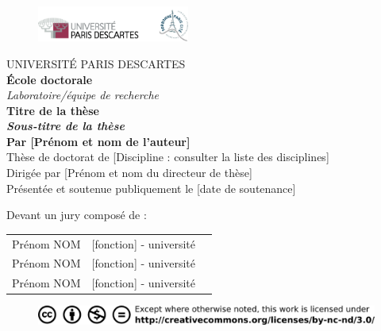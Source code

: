 \begin{titlepage}
\frontmatter
\begin{figure}[t]
\includegraphics[width=5cm]{figures-ext/LogoParisDescartes}
\end{figure}

\begin{center}
UNIVERSITÉ PARIS DESCARTES \\
\vspace*{1cm}
\textbf{École doctorale}\\
\vspace*{0,5cm}
\textit{Laboratoire/équipe de recherche}\\
\vspace*{1cm}
\LARGE{\textbf{Titre de la thèse}}\\
\vspace*{0,5cm}
\large{\textit{\textbf{Sous-titre de la thèse}}}\\
\vspace*{2cm}
\large{\textbf{Par [Prénom et nom de l'auteur]}}\\
\vspace*{1cm}
Thèse de doctorat de [Discipline : consulter la liste des disciplines]\\
\vspace*{1cm}
Dirigée par [Prénom et nom du directeur de thèse]\\
\vspace*{1cm}
\small{Présentée et soutenue publiquement le [date de soutenance]}\\
\end{center}
\vspace*{1cm}
\begin{footnotesize}
Devant un jury composé de : \\
\begin{tabular}{lll}
Prénom NOM & [fonction] - université\\
Prénom NOM & [fonction] - université\\
Prénom NOM & [fonction] - université\\
\end{tabular}
\end{footnotesize}

\begin{figure}[b]
\begin{center}
\includegraphics{figures-ext/creativecommons}
\end{center}
\end{figure}





\end{titlepage}
